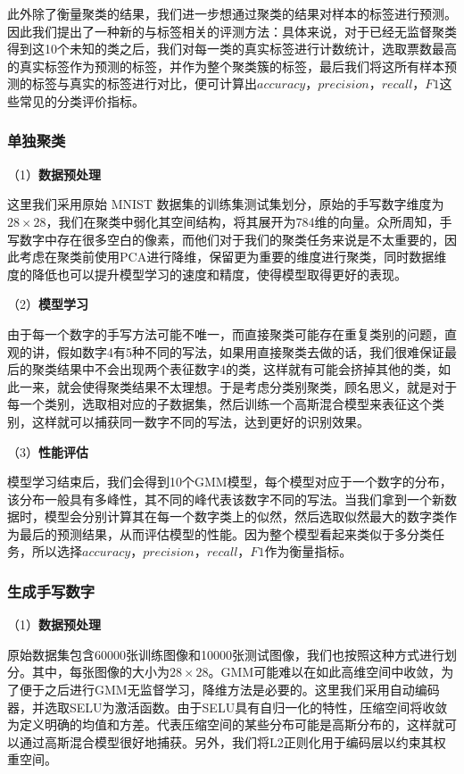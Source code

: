 \documentclass[UTF8]{ctexart}
\begin{document}
此外除了衡量聚类的结果，我们进一步想通过聚类的结果对样本的标签进行预测。因此我们提出了一种新的与标签相关的评测方法：具体来说，对于已经无监督聚类得到这10个未知的类之后，我们对每一类的真实标签进行计数统计，选取票数最高的真实标签作为预测的标签，并作为整个聚类簇的标签，最后我们将这所有样本预测的标签与真实的标签进行对比，便可计算出$accuracy$，$precision$，$recall$，$F1$这些常见的分类评价指标。

\subsubsection{单独聚类}

（1）\textbf{数据预处理}

这里我们采用原始 MNIST 数据集的训练集测试集划分，原始的手写数字维度为$28 \times 28$，我们在聚类中弱化其空间结构，将其展开为784维的向量。众所周知，手写数字中存在很多空白的像素，而他们对于我们的聚类任务来说是不太重要的，因此考虑在聚类前使用PCA进行降维，保留更为重要的维度进行聚类，同时数据维度的降低也可以提升模型学习的速度和精度，使得模型取得更好的表现。

（2）\textbf{模型学习}

由于每一个数字的手写方法可能不唯一，而直接聚类可能存在重复类别的问题，直观的讲，假如数字4有5种不同的写法，如果用直接聚类去做的话，我们很难保证最后的聚类结果中不会出现两个表征数字4的类，这样就有可能会挤掉其他的类，如此一来，就会使得聚类结果不太理想。于是考虑分类别聚类，顾名思义，就是对于每一个类别，选取相对应的子数据集，然后训练一个高斯混合模型来表征这个类别，这样就可以捕获同一数字不同的写法，达到更好的识别效果。

（3）\textbf{性能评估}

模型学习结束后，我们会得到10个GMM模型，每个模型对应于一个数字的分布，该分布一般具有多峰性，其不同的峰代表该数字不同的写法。当我们拿到一个新数据时，模型会分别计算其在每一个数字类上的似然，然后选取似然最大的数字类作为最后的预测结果，从而评估模型的性能。因为整个模型看起来类似于多分类任务，所以选择$accuracy$，$precision$，$recall$，$F1$作为衡量指标。

\subsubsection{生成手写数字}

（1）\textbf{数据预处理}

原始数据集包含60000张训练图像和10000张测试图像，我们也按照这种方式进行划分。其中，每张图像的大小为$28 \times 28$。GMM可能难以在如此高维空间中收敛，为了便于之后进行GMM无监督学习，降维方法是必要的。这里我们采用自动编码器，并选取SELU为激活函数。由于SELU具有自归一化的特性，压缩空间将收敛为定义明确的均值和方差。代表压缩空间的某些分布可能是高斯分布的，这样就可以通过高斯混合模型很好地捕获。另外，我们将L2正则化用于编码层以约束其权重空间。
\end{document}
